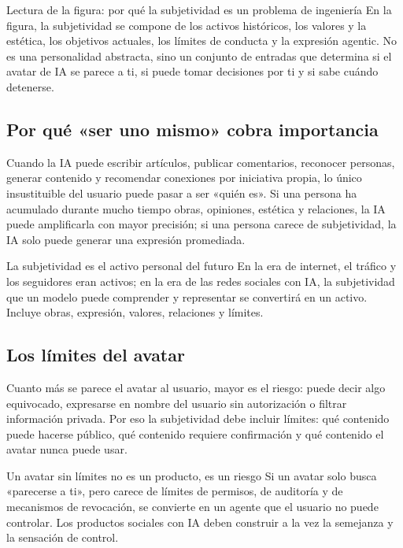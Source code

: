 \documentclass[a4paper]{article}
\begin{document}
\begin{knowledgebox}{Lectura de la figura: por qué la subjetividad es un problema de ingeniería}
En la figura, la subjetividad se compone de los activos históricos, los valores y la estética, los objetivos actuales, los límites de conducta y la expresión agentic. No es una personalidad abstracta, sino un conjunto de entradas que determina si el avatar de IA se parece a ti, si puede tomar decisiones por ti y si sabe cuándo detenerse.
\end{knowledgebox}

\subsection{Por qué «ser uno mismo» cobra importancia}

Cuando la IA puede escribir artículos, publicar comentarios, reconocer personas, generar contenido y recomendar conexiones por iniciativa propia, lo único insustituible del usuario puede pasar a ser «quién es». Si una persona ha acumulado durante mucho tiempo obras, opiniones, estética y relaciones, la IA puede amplificarla con mayor precisión; si una persona carece de subjetividad, la IA solo puede generar una expresión promediada.

\begin{importantbox}{La subjetividad es el activo personal del futuro}
En la era de internet, el tráfico y los seguidores eran activos; en la era de las redes sociales con IA, la subjetividad que un modelo puede comprender y representar se convertirá en un activo. Incluye obras, expresión, valores, relaciones y límites.
\end{importantbox}

\subsection{Los límites del avatar}

Cuanto más se parece el avatar al usuario, mayor es el riesgo: puede decir algo equivocado, expresarse en nombre del usuario sin autorización o filtrar información privada. Por eso la subjetividad debe incluir límites: qué contenido puede hacerse público, qué contenido requiere confirmación y qué contenido el avatar nunca puede usar.

\begin{warningbox}{Un avatar sin límites no es un producto, es un riesgo}
Si un avatar solo busca «parecerse a ti», pero carece de límites de permisos, de auditoría y de mecanismos de revocación, se convierte en un agente que el usuario no puede controlar. Los productos sociales con IA deben construir a la vez la semejanza y la sensación de control.
\end{warningbox}
\end{document}
